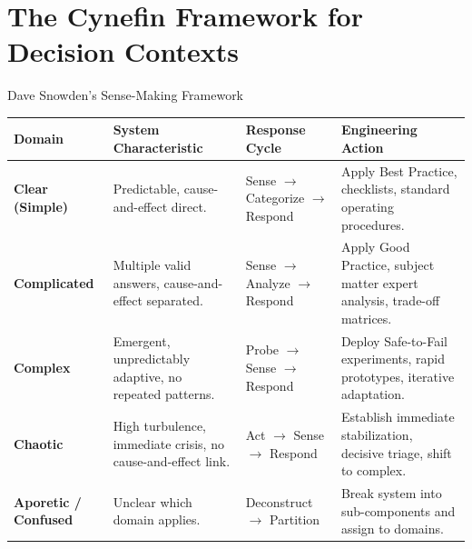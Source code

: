 \section{The Cynefin Framework for Decision Contexts}

\begin{frameworkbox}{Dave Snowden's Sense-Making Framework}
\begin{tabularx}{\linewidth}{|l|l|l|X|} \hline
\textbf{Domain} & \textbf{System Characteristic} & \textbf{Response Cycle} & \textbf{Engineering Action} \\ \hline
\textbf{Clear (Simple)} & Predictable, cause-and-effect direct. & Sense $\to$ Categorize $\to$ Respond & Apply Best Practice, checklists, standard operating procedures. \\ \hline
\textbf{Complicated} & Multiple valid answers, cause-and-effect separated. & Sense $\to$ Analyze $\to$ Respond & Apply Good Practice, subject matter expert analysis, trade-off matrices. \\ \hline
\textbf{Complex} & Emergent, unpredictably adaptive, no repeated patterns. & Probe $\to$ Sense $\to$ Respond & Deploy Safe-to-Fail experiments, rapid prototypes, iterative adaptation. \\ \hline
\textbf{Chaotic} & High turbulence, immediate crisis, no cause-and-effect link. & Act $\to$ Sense $\to$ Respond & Establish immediate stabilization, decisive triage, shift to complex. \\ \hline
\textbf{Aporetic / Confused} & Unclear which domain applies. & Deconstruct $\to$ Partition & Break system into sub-components and assign to domains. \\ \hline
\end{tabularx}
\end{frameworkbox}
